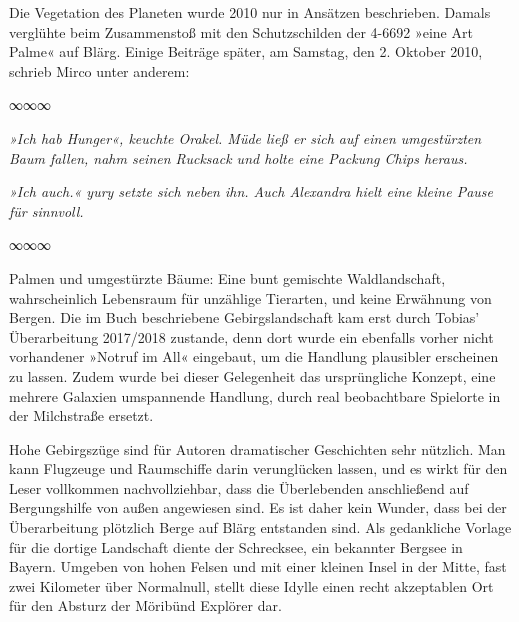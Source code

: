 Die Vegetation des Planeten wurde 2010 nur in Ansätzen beschrieben. Damals verglühte beim Zusammenstoß mit den Schutzschilden der 4-6692 »eine Art Palme« auf Blärg. Einige Beiträge später, am Samstag, den 2. Oktober 2010, schrieb Mirco unter anderem:

\begin{center}
    ∞∞∞
\end{center}

\textit{»Ich hab Hunger«, keuchte Orakel. Müde ließ er sich auf einen umgestürzten Baum fallen, nahm seinen Rucksack und holte eine Packung Chips heraus.}

\textit{»Ich auch.« yury setzte sich neben ihn. Auch Alexandra hielt eine kleine Pause für sinnvoll.}

\begin{center}
    ∞∞∞
\end{center}

Palmen und umgestürzte Bäume: Eine bunt gemischte Waldlandschaft, wahrscheinlich Lebensraum für unzählige Tierarten, und keine Erwähnung von Bergen. Die im Buch beschriebene Gebirgslandschaft kam erst durch Tobias’ Überarbeitung 2017/2018 zustande, denn dort wurde ein ebenfalls vorher nicht vorhandener »Notruf im All« eingebaut, um die Handlung plausibler erscheinen zu lassen. Zudem wurde bei dieser Gelegenheit das ursprüngliche Konzept, eine mehrere Galaxien umspannende Handlung, durch real beobachtbare Spielorte in der Milchstraße ersetzt.

Hohe Gebirgszüge sind für Autoren dramatischer Geschichten sehr nützlich. Man kann Flugzeuge und Raumschiffe darin verunglücken lassen, und es wirkt für den Leser vollkommen nachvollziehbar, dass die Überlebenden anschließend auf Bergungshilfe von außen angewiesen sind. Es ist daher kein Wunder, dass bei der Überarbeitung plötzlich Berge auf Blärg entstanden sind. Als gedankliche Vorlage für die dortige Landschaft diente der Schrecksee, ein bekannter Bergsee in Bayern. Umgeben von hohen Felsen und mit einer kleinen Insel in der Mitte, fast zwei Kilometer über Normalnull, stellt diese Idylle einen recht akzeptablen Ort für den Absturz der Möribünd Explörer dar.

\cleardoubleoddpage

%

\cleardoubleoddpage

%

